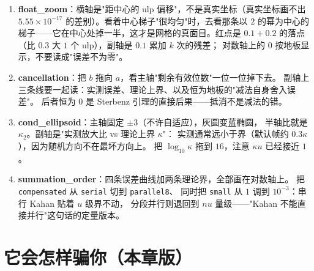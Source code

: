\begin{enumerate}
  \item \textbf{float\_zoom}：横轴是"距中心的 ulp 偏移"，不是真实坐标（真实坐标画不出
        $5.55\times10^{-17}$ 的差别）。看着中心梯子"很均匀"时，去看那条以 $2$ 的幂为中心的
        梯子——它在中心处掉一半，这才是网格的真面目。红点是 $0.1+0.2$ 的落点
        （比 $0.3$ 大 $1$ 个 ulp），副轴是 $0.1$ 累加 $k$ 次的残差；
        对数轴上的 $0$ 按地板显示，不要读成"误差不为零"。
  \item \textbf{cancellation}：把 $b$ 拖向 $a$，看主轴"剩余有效位数"一位一位掉下去。
        副轴上三条线要一起读：实测误差、理论上界、以及恒为地板的"减法自身舍入误差"。
        后者恒为 $0$ 是 Sterbenz 引理的直接后果——抵消不是减法的错。
  \item \textbf{cond\_ellipsoid}：主轴固定 $\pm3$（不许自适应），灰圆变蓝椭圆，
        半轴比就是 $\kappa_2$。副轴是"实测放大比 vs 理论上界 $\kappa$"：
        实测通常远小于界（默认帧约 $0.3\kappa$），因为随机方向不在最坏方向上。
        把 $\log_{10}\kappa$ 拖到 $16$，注意 $\kappa u$ 已经接近 $1$。
  \item \textbf{summation\_order}：四条误差曲线加两条理论界，全部画在对数轴上。
        把 \texttt{compensated} 从 \texttt{serial} 切到 \texttt{parallel8}、
        同时把 \texttt{small} 从 $1$ 调到 $10^{-3}$：串行 Kahan 贴着 $u$ 级界不动，
        分段并行则退回到 $n u$ 量级——"Kahan 不能直接并行"这句话的定量版本。
\end{enumerate}



\section{它会怎样骗你（本章版）}

